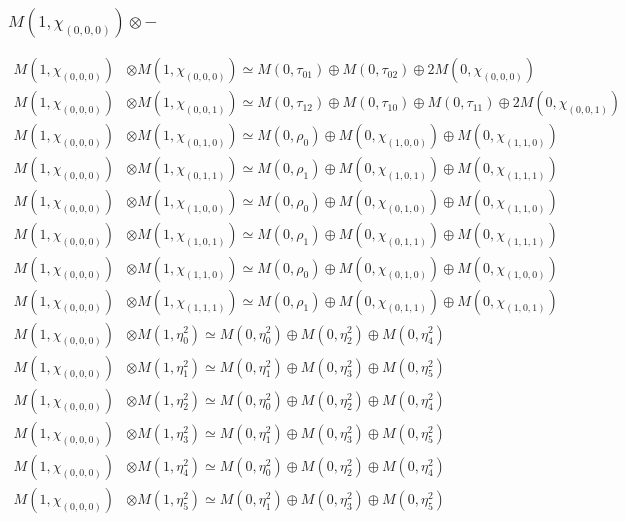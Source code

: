 \subsubsection{$ M(1,\chi_{(0,0,0)})\otimes -$}
\begin{align*}
M(1,\chi_{(0,0,0)}) &\otimes M(1,\chi_{(0,0,0)}) \simeq M(0,\tau_{01}) \oplus M(0,\tau_{02}) \oplus 2 M(0,\chi_{(0,0,0)}) \\
M(1,\chi_{(0,0,0)}) &\otimes M(1,\chi_{(0,0,1)}) \simeq M(0,\tau_{12}) \oplus M(0,\tau_{10}) \oplus M(0,\tau_{11}) \oplus 2 M(0,\chi_{(0,0,1)}) \\
M(1,\chi_{(0,0,0)}) &\otimes M(1,\chi_{(0,1,0)}) \simeq M(0,\rho_{0}) \oplus M(0,\chi_{(1,0,0)}) \oplus M(0,\chi_{(1,1,0)}) \\
M(1,\chi_{(0,0,0)}) &\otimes M(1,\chi_{(0,1,1)}) \simeq M(0,\rho_{1}) \oplus M(0,\chi_{(1,0,1)}) \oplus M(0,\chi_{(1,1,1)}) \\
M(1,\chi_{(0,0,0)}) &\otimes M(1,\chi_{(1,0,0)}) \simeq M(0,\rho_{0}) \oplus M(0,\chi_{(0,1,0)}) \oplus M(0,\chi_{(1,1,0)}) \\
M(1,\chi_{(0,0,0)}) &\otimes M(1,\chi_{(1,0,1)}) \simeq M(0,\rho_{1}) \oplus M(0,\chi_{(0,1,1)}) \oplus M(0,\chi_{(1,1,1)}) \\
M(1,\chi_{(0,0,0)}) &\otimes M(1,\chi_{(1,1,0)}) \simeq M(0,\rho_{0}) \oplus M(0,\chi_{(0,1,0)}) \oplus M(0,\chi_{(1,0,0)}) \\
M(1,\chi_{(0,0,0)}) &\otimes M(1,\chi_{(1,1,1)}) \simeq M(0,\rho_{1}) \oplus M(0,\chi_{(0,1,1)}) \oplus M(0,\chi_{(1,0,1)}) \\
M(1,\chi_{(0,0,0)}) &\otimes M(1,\eta^{2}_{0}) \simeq M(0,\eta^{2}_{0}) \oplus M(0,\eta^{2}_{2}) \oplus M(0,\eta^{2}_{4}) \\
M(1,\chi_{(0,0,0)}) &\otimes M(1,\eta^{2}_{1}) \simeq M(0,\eta^{2}_{1}) \oplus M(0,\eta^{2}_{3}) \oplus M(0,\eta^{2}_{5}) \\
M(1,\chi_{(0,0,0)}) &\otimes M(1,\eta^{2}_{2}) \simeq M(0,\eta^{2}_{0}) \oplus M(0,\eta^{2}_{2}) \oplus M(0,\eta^{2}_{4}) \\
M(1,\chi_{(0,0,0)}) &\otimes M(1,\eta^{2}_{3}) \simeq M(0,\eta^{2}_{1}) \oplus M(0,\eta^{2}_{3}) \oplus M(0,\eta^{2}_{5}) \\
M(1,\chi_{(0,0,0)}) &\otimes M(1,\eta^{2}_{4}) \simeq M(0,\eta^{2}_{0}) \oplus M(0,\eta^{2}_{2}) \oplus M(0,\eta^{2}_{4}) \\
M(1,\chi_{(0,0,0)}) &\otimes M(1,\eta^{2}_{5}) \simeq M(0,\eta^{2}_{1}) \oplus M(0,\eta^{2}_{3}) \oplus M(0,\eta^{2}_{5}) \\

\end{align*}
